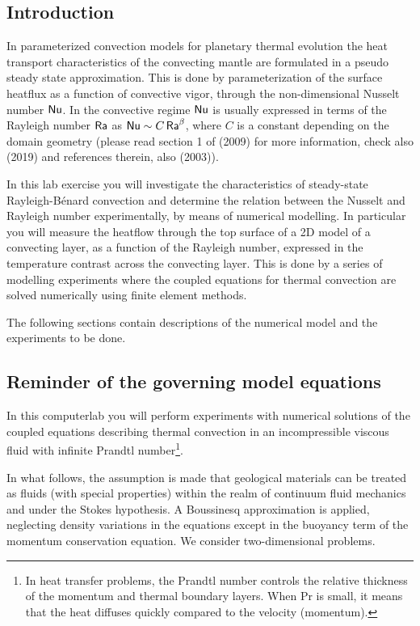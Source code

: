
\subsection{Introduction}

In parameterized convection models for planetary thermal evolution the heat transport characteristics 
of the convecting mantle are formulated in a pseudo steady state approximation. 
This is done by parameterization of the surface heatflux as a function of convective vigor, 
through the non-dimensional Nusselt number ${\mathsf{Nu}}$. 
In the convective regime ${\mathsf{Nu}}$ is usually expressed in terms of the 
Rayleigh number ${\mathsf{Ra}}$ as ${\mathsf{Nu}} \sim C\, {\mathsf{Ra}}^\beta$, where $C$ is a 
constant depending on the domain geometry
(please read section 1 of \textcite{wodd09} (2009)
for more information, check also \textcite{plju19} (2019) and references therein, 
also \textcite{kore03} (2003)).

In this lab exercise you will investigate the characteristics of steady-state Rayleigh-B{\'e}nard convection 
and determine the relation between the Nusselt and Rayleigh number experimentally, 
by means of numerical modelling. In particular you will measure the heatflow through the top surface of 
a 2D model of a convecting layer, as a function of the Rayleigh number, expressed in the temperature 
contrast across the convecting layer. 
This is done by a series of modelling experiments where the coupled equations for thermal convection are solved 
numerically using finite element methods.

The following sections contain descriptions of the numerical model and the experiments to be done. 

\subsection{Reminder of the governing model equations}

In this computerlab you will perform experiments with numerical solutions of the 
coupled equations describing thermal convection in an 
incompressible viscous fluid with infinite Prandtl number\footnote{In heat transfer problems, 
the Prandtl number controls the relative thickness of 
the momentum and thermal boundary layers. When Pr is small, it means that the heat diffuses 
quickly compared to the velocity (momentum).}.

In what follows, the assumption is made that geological materials can be treated as fluids (with 
special properties) within the realm of continuum fluid mechanics and under the Stokes hypothesis.
A Boussinesq approximation is applied, neglecting density variations in the equations except 
in the buoyancy term of the momentum conservation equation. We consider two-dimensional problems.

